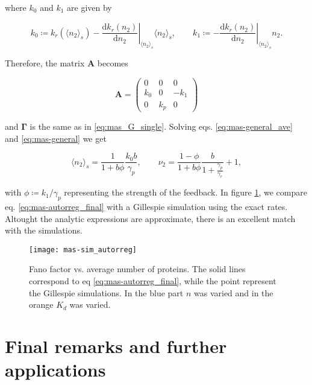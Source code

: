 where $k_0$ and $k_1$ are given by

\begin{equation*}
  k_0\coloneqq k_r(\langle n_2\rangle_s) - \left.\frac{\mathrm{d}k_r(n_2)}{\mathrm{d}n_2}\right|_{\langle n_2\rangle_s}\langle n_2\rangle_s,\quad\quad k_1 \coloneqq -\left.\frac{\mathrm{d}k_r(n_2)}{\mathrm{d}n_2}\right|_{\langle n_2\rangle_s}n_2. 
\end{equation*}

Therefore, the matrix $\mathbf{A}$ becomes

\begin{equation*}
  \mathbf{A} =
  \begin{pmatrix}
    0 & 0 & 0 \\
    k_0 & 0 & -k_1 \\
    0 & k_p & 0
  \end{pmatrix}
\end{equation*}

and $\mathbf{\Gamma}$ is the same as in \eqref{eq:mas_G_single}. Solving eqs. \eqref{eq:mas-general_ave} and \eqref{eq:mas-general} we get

\begin{equation}
  \label{eq:mas-autorreg_final}
  \boxed{\langle n_2\rangle_s = \frac{1}{1+b\phi}\frac{k_0b}{\gamma_p}},\quad\quad \boxed{\nu_2 = \frac{1-\phi}{1+b\phi}\frac{b}{1+\frac{\gamma_p}{\gamma_r}}+1},
\end{equation}


with $\phi\coloneqq k_1/\gamma_p$ representing the strength of the feedback. In figure \ref{fig:mas-sim_autorreg}, we compare eq. \eqref{eq:mas-autorreg_final}  with a Gillespie simulation using the exact rates. Altought the analytic expressions are approximate, there is an excellent match with the simulations.

\begin{figure}[H]
  \centering
  \texttt{[image: mas-sim\_autorreg]}
  \caption[Autorregulation simulation results]{\label{fig:mas-sim_autorreg} Fano factor vs. average number of proteins. The solid lines correspond to eq \eqref{eq:mas-autorreg_final}, while the point represent the Gillespie simulations. In the blue part $n$ was varied and in the orange $K_d$ was varied.}
\end{figure}

\section{Final remarks and further applications}

